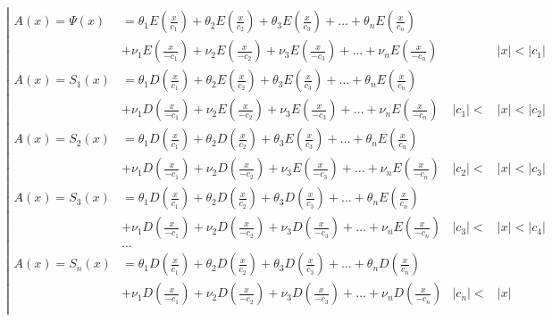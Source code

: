 \begin{equation*} \left| \begin{aligned}
A(x) = \Psi(x) &=
  \theta_1 E{\left(\frac{x}{c_1} \right)} 
+ \theta_2 E{\left(\frac{x}{c_2} \right)} 
+ \theta_3 E{\left(\frac{x}{c_3} \right)} 
+ \ldots 
+ \theta_n E{\left(\frac{x}{c_n} \right)} \\ &
+ \nu_1 E{\left(\frac{x}{- c_1} \right)} 
+ \nu_2 E{\left(\frac{x}{- c_2} \right)} 
+ \nu_3 E{\left(\frac{x}{- c_3} \right)} 
+ \ldots 
+ \nu_n E{\left(\frac{x}{- c_n} \right)} &
&|x| < |c_1| \\
%
A(x) = S_1(x) &=
  \theta_1 D{\left(\frac{x}{c_1} \right)} 
+ \theta_2 E{\left(\frac{x}{c_2} \right)} 
+ \theta_3 E{\left(\frac{x}{c_3} \right)} 
+ \ldots 
+ \theta_n E{\left(\frac{x}{c_n} \right)} \\ &
+ \nu_1 D{\left(\frac{x}{- c_1} \right)} 
+ \nu_2 E{\left(\frac{x}{- c_2} \right)} 
+ \nu_3 E{\left(\frac{x}{- c_3} \right)} 
+ \ldots 
+ \nu_n E{\left(\frac{x}{- c_n} \right)} & 
|c_1| < &|x| < |c_2| \\
%
A(x) = S_2(x) &=
  \theta_1 D{\left(\frac{x}{c_1} \right)} 
+ \theta_2 D{\left(\frac{x}{c_2} \right)} 
+ \theta_3 E{\left(\frac{x}{c_3} \right)} 
+ \ldots 
+ \theta_n E{\left(\frac{x}{c_n} \right)} \\ &
+ \nu_1 D{\left(\frac{x}{- c_1} \right)} 
+ \nu_2 D{\left(\frac{x}{- c_2} \right)} 
+ \nu_3 E{\left(\frac{x}{- c_3} \right)} 
+ \ldots 
+ \nu_n E{\left(\frac{x}{- c_n} \right)} & 
|c_2| < &|x| < |c_3| \\
%
A(x) = S_3(x) &=
  \theta_1 D{\left(\frac{x}{c_1} \right)} 
+ \theta_2 D{\left(\frac{x}{c_2} \right)} 
+ \theta_3 D{\left(\frac{x}{c_3} \right)} 
+ \ldots 
+ \theta_n E{\left(\frac{x}{c_n} \right)} \\ &
+ \nu_1 D{\left(\frac{x}{- c_1} \right)} 
+ \nu_2 D{\left(\frac{x}{- c_2} \right)} 
+ \nu_3 D{\left(\frac{x}{- c_3} \right)} 
+ \ldots 
+ \nu_n E{\left(\frac{x}{- c_n} \right)} &
|c_3| < &|x| < |c_4| \\
&\ldots & & \\
%
A(x) = S_n(x) &=
  \theta_1 D{\left(\frac{x}{c_1} \right)} 
+ \theta_2 D{\left(\frac{x}{c_2} \right)} 
+ \theta_3 D{\left(\frac{x}{c_3} \right)} 
+ \ldots 
+ \theta_n D{\left(\frac{x}{c_n} \right)} \\ &
+ \nu_1 D{\left(\frac{x}{- c_1} \right)} 
+ \nu_2 D{\left(\frac{x}{- c_2} \right)} 
+ \nu_3 D{\left(\frac{x}{- c_3} \right)} 
+ \ldots 
+ \nu_n D{\left(\frac{x}{- c_n} \right)} &
|c_n| < &|x| \\
\end{aligned} \right. \end{equation*}

